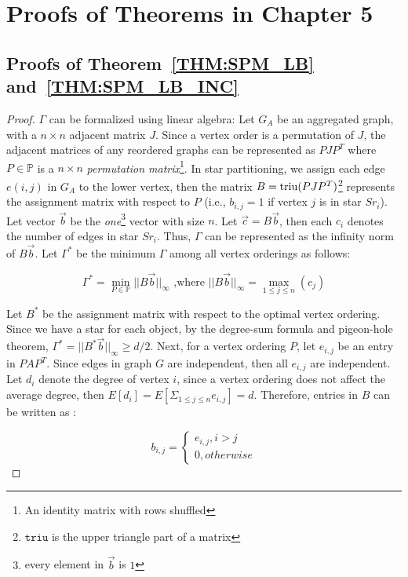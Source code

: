 \section{Proofs of Theorems in Chapter 5}
\subsection{Proofs of Theorem~\ref{THM:SPM_LB} and~\ref{THM:SPM_LB_INC}}
\label{apx:thm2proof}

\begin{proof}
$\Gamma$ can be formalized using linear algebra:
Let $G_A$ be an aggregated graph, with a $n \times n$ adjacent matrix $J$.
Since a vertex order is a permutation of $J$, the adjacent matrices 
of any reordered graphs can be represented as $PJP^T$
where $P \in \mathbb{P}$ is a $n\times n$ \emph{permutation matrix}\footnote{An identity matrix with rows shuffled}.
In star partitioning, we assign each edge $e(i,j)$ in $G_A$ to the lower vertex, 
then the matrix $B=\operatorname*{triu}(PJP^T)$\footnote{$\mathtt{triu}$ is the upper triangle part of a matrix}
represents the assignment matrix with respect to $P$ (i.e., $b_{i,j} = 1$ if vertex $j$ is in star $Sr_i$).
Let vector $\vec{b}$ be the \textit{one}\footnote{every element in $\vec{b}$ is $1$} 
vector with size $n$. Let $\vec{c} = B\vec{b}$, then each $c_i$ 
denotes the number of edges in star $Sr_i$. Thus, $\Gamma$ can be represented
as the infinity norm of $B\vec{b}$. Let $\Gamma^*$ be the minimum $\Gamma$ among all vertex orderings as follows:

\begin{equation}
\Gamma^* = \min_{P \in \mathbb{P}}{||B\vec{b}||_\infty} \text{ ,where } ||B\vec{b}||_\infty = \max_{1\leq j \leq n}(c_j)
\end{equation}

Let $B^*$ be the assignment matrix with respect to the optimal vertex ordering.
Since we have a star for each object, by the degree-sum formula and pigeon-hole theorem, 
$\Gamma^*=||B^*\vec{b}||_\infty \geq d/2$.
Next, for a vertex ordering $P$, let $e_{i,j}$ be an entry in $PAP^T$. Since 
edges in graph $G$ are independent, then all $e_{i,j}$ are independent. 
Let $d_i$ denote the degree of vertex $i$, since a vertex ordering does not
affect the average degree,
then $E[d_i]=E[\Sigma_{1\leq j \leq n}e_{i,j}]=d$. Therefore, 
entries in $B$ can be written as :

\begin{equation*}
b_{i,j} = \begin{cases}
			e_{i,j}, i>j \\
			0, otherwise
		  \end{cases}  
\end{equation*}


\end{proof}
